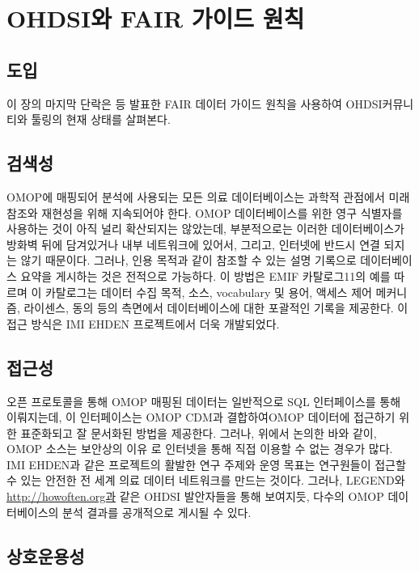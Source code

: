 \documentclass[11pt]{book}
\theoremstyle{definition}
\theoremstyle{definition}
\theoremstyle{definition}
\theoremstyle{remark}
\begin{document}
\section{OHDSI와 FAIR 가이드 원칙}\label{ohdsi-fair--}


\subsection{도입}

이 장의 마지막 단락은 \citet{wilkinson2016} 등 발표한 FAIR 데이터 가이드
원칙을 사용하여 OHDSI커뮤니티와 툴링의 현재 상태를 살펴본다.

\subsection{검색성}

OMOP에 매핑되어 분석에 사용되는 모든 의료 데이터베이스는 과학적 관점에서
미래 참조와 재현성을 위해 지속되어야 한다. OMOP 데이터베이스를 위한 영구
식별자를 사용하는 것이 아직 널리 확산되지는 않았는데, 부분적으로는
이러한 데이터베이스가 방화벽 뒤에 담겨있거나 내부 네트워크에 있어서,
그리고, 인터넷에 반드시 연결 되지는 않기 때문이다. 그러나, 인용 목적과
같이 참조할 수 있는 설명 기록으로 데이터베이스 요약을 게시하는 것은
전적으로 가능하다. 이 방법은 EMIF 카탈로그11의 예를 따르며 이 카탈로그는
데이터 수집 목적, 소스, vocabulary 및 용어, 액세스 제어 메커니즘,
라이센스, 동의 등의 측면에서 데이터베이스에 대한 포괄적인 기록을
제공한다. \citep{Oliveira2019} 이 접근 방식은 IMI EHDEN 프로젝트에서
더욱 개발되었다.

\subsection{접근성}

오픈 프로토콜을 통해 OMOP 매핑된 데이터는 일반적으로 SQL 인터페이스를
통해 이뤄지는데, 이 인터페이스는 OMOP CDM과 결합하여OMOP 데이터에
접근하기 위한 표준화되고 잘 문서화된 방법을 제공한다. 그러나, 위에서
논의한 바와 같이, OMOP 소스는 보안상의 이유 로 인터넷을 통해 직접 이용할
수 없는 경우가 많다. IMI EHDEN과 같은 프로젝트의 활발한 연구 주제와 운영
목표는 연구원들이 접근할 수 있는 안전한 전 세계 의료 데이터 네트워크를
만드는 것이다. 그러나, LEGEND와 \url{http://howoften.org과} 같은 OHDSI
발안자들을 통해 보여지듯, 다수의 OMOP 데이터베이스의 분석 결과를
공개적으로 게시될 수 있다.

\subsection{상호운용성}
\end{document}
